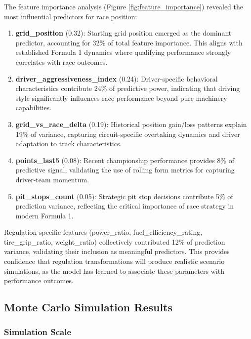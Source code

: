 \documentclass[conference]{IEEEtran}
\begin{document}
The feature importance analysis (Figure \ref{fig:feature_importance}) revealed the most influential predictors for race position:

\begin{enumerate}
    \item \textbf{grid\_position} (0.32): Starting grid position emerged as the dominant predictor, accounting for 32\% of total feature importance. This aligns with established Formula 1 dynamics where qualifying performance strongly correlates with race outcomes.
    
    \item \textbf{driver\_aggressiveness\_index} (0.24): Driver-specific behavioral characteristics contribute 24\% of predictive power, indicating that driving style significantly influences race performance beyond pure machinery capabilities.
    
    \item \textbf{grid\_vs\_race\_delta} (0.19): Historical position gain/loss patterns explain 19\% of variance, capturing circuit-specific overtaking dynamics and driver adaptation to track characteristics.
    
    \item \textbf{points\_last5} (0.08): Recent championship performance provides 8\% of predictive signal, validating the use of rolling form metrics for capturing driver-team momentum.
    
    \item \textbf{pit\_stops\_count} (0.05): Strategic pit stop decisions contribute 5\% of prediction variance, reflecting the critical importance of race strategy in modern Formula 1.
\end{enumerate}

Regulation-specific features (power\_ratio, fuel\_efficiency\_rating, tire\_grip\_ratio, weight\_ratio) collectively contributed 12\% of prediction variance, validating their inclusion as meaningful predictors. This provides confidence that regulation transformations will produce realistic scenario simulations, as the model has learned to associate these parameters with performance outcomes.

\subsection{Monte Carlo Simulation Results}

\subsubsection{Simulation Scale}
\end{document}
